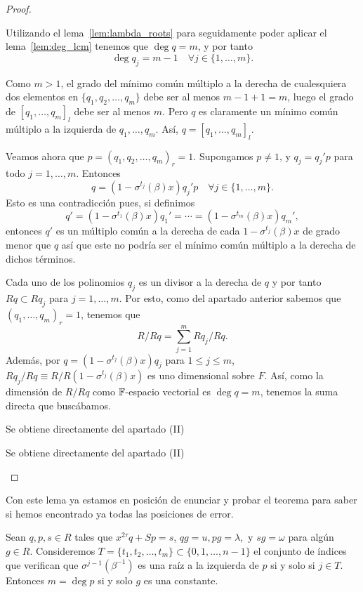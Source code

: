 \begin{proof}
\begin{nlist}
    \item Utilizando el lema~\ref{lem:lambda_roots} para seguidamente poder aplicar el lema~\ref{lem:deg_lcm} tenemos que \(\deg q = m\), y por tanto
    \[
    \deg q_j = m-1 \quad \forall j \in \{1, \ldots, m\}.
    \]

    Como \(m > 1\), el grado del mínimo común múltiplo a la derecha de cualesquiera dos elementos en \(\{q_1, q_2, \ldots, q_m\}\) debe ser al menos \(m - 1 + 1 = m\), luego el grado de  \({[q_1, \ldots, q_m]}_l\) debe ser al menos \(m\). Pero \(q\) es claramente un mínimo común múltiplo a la izquierda de  \(q_1, \ldots, q_m\). Así, \(q = {[q_1, \ldots, q_m]}_l \).

Veamos ahora que \(p = {(q_1, q_2, \ldots, q_m)}_r = 1\). Supongamos \(p \neq 1\), y  \(q_j = q_j'p\) para todo \(j = 1, \ldots, m\). Entonces
\[
q = (1 - \sigma^{t_j}(\beta)x)q_j'p \quad \forall j \in \{1, \ldots, m\}
.\]
Esto es una contradicción pues, si definimos
\[
q' = (1 - \sigma^{t_1}(\beta)x)q_1' = \cdots = (1 - \sigma^{t_m}(\beta)x)q_m'
,\]
entonces \(q'\) es un múltiplo común a la derecha de cada \(1 - \sigma^{t_j}(\beta)x\) de grado menor que \(q\) así que este no podría ser el mínimo común múltiplo a la derecha de dichos términos.
    \item Cada uno de los polinomios \(q_j\) es un divisor a la derecha de \(q\) y por tanto \(Rq \subset Rq_j\) para \(j = 1, \ldots, m\). Por esto, como del apartado anterior sabemos que \({(q_1, \ldots, q_m)}_r = 1\), tenemos que
    \[
    R/Rq = \sum_{j=1}^{m} Rq_j/Rq
    .\]
Además, por \(q = (1 - \sigma^{t_j}(\beta)x)q_j\) para \(1 \le j \le m\),  \(Rq_j / Rq \equiv R / R(1-\sigma^{t_j}(\beta)x)\) es uno dimensional sobre \(F\). Así, como la dimensión de \(R / Rq\) como  \(\mathbb{F}\)-espacio vectorial es  \(\deg q = m\), tenemos la suma directa que buscábamos.

    \item Se obtiene directamente del apartado (II)
    \item Se obtiene directamente del apartado (II)
\end{nlist}
\end{proof}

Con este lema ya estamos en posición de enunciar y probar el teorema para saber si hemos encontrado ya todas las posiciones de error.

\begin{theorem}
\label{th:failure_cond}
    Sean \(q, p, s \in R\)  tales que \(x^{2\tau}q + Sp = s\),  \(qg = u, pg = \lambda, \text{ y  } sg = \omega\) para algún \(g \in R\). Consideremos \(T = \{t_1, t_2, \ldots, t_{m}\} \subset \{0,1, \ldots, n-1\}\) el conjunto de índices que verifican que \(\sigma^{j-1}(\beta^{-1})\) es una raíz a la izquierda de \(p\) si y solo si  \(j \in T\). Entonces \(m = \deg p \) si y solo \(g\) es una constante.
\end{theorem}

